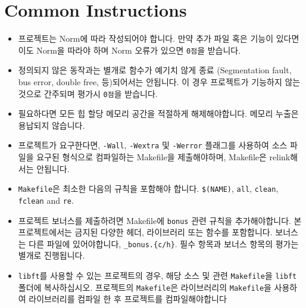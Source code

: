 
\chapter{Common Instructions}
    \begin{itemize}

      \item 프로젝트는 Norm에 따라 작성되어야 합니다. 만약 추가 파일 혹은 기능이 있다면 이도 Norm을 따라야 하며 Norm 오류가 있으면 \texttt{0점}을 받습니다.

      \item 정의되지 않은 동작과는 별개로 함수가 예기치 않게 종료 (Segmentation fault, bus error, double free, 등)되어서는 안됩니다. 이 경우 프로젝트가 기능하지 않는 것으로 간주되며 평가시 \texttt{0점}을 받습니다.

      \item 필요하다면 모든 힙 할당 메모리 공간을 적절하게 해제해야합니다. 메모리 누출은 용납되지 않습니다.

      \item 프로젝트가 요구한다면,  \texttt{-Wall}, \texttt{-Wextra} 및 \texttt{-Werror} 플래그를 사용하여 소스 파일을 요구된 형식으로 컴파일하는 Makefile을 제출해야하며, Makefile은 relink해서는 안됩니다.

      \item \texttt{Makefile}은 최소한 다음의 규칙을 포함해야 합니다. \texttt{\$(NAME)}, \texttt{all}, \texttt{clean}, \texttt{fclean} and \texttt{re}.

      \item 프로젝트 보너스를 제출하려면 Makefile에 \texttt{bonus} 관련 규칙을 추가해야합니다. 본 프로젝트에서는 금지된 다양한 헤더, 라이브러리 또는 함수를 포함합니다. 보너스는 다른 파일에 있어야합니다, \texttt{\*\_bonus.\{c/h\}}. 필수 항목과 보너스 항목의 평가는 별개로 진행됩니다.

      \item \texttt{libft}를 사용할 수 있는 프로젝트의 경우, 해당 소스 및 관련 \texttt{Makefile}을 \texttt{libft} 폴더에 복사하십시오. 프로젝트의 \texttt{Makefile}은 라이브러리의 \texttt{Makefile}을 사용하여 라이브러리를 컴파일 한 후 프로젝트를 컴파일해야합니다


\end{itemize}

